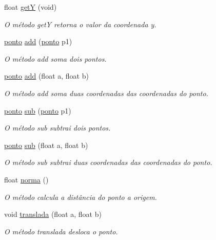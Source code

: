 \begin{DoxyCompactItemize}
float \hyperlink{classponto_a39aa79bee16cdf153e6434882ad342bc}{getY} (void)
\begin{DoxyCompactList}\small\item\em O método getY retorna o valor da coordenada y. \end{DoxyCompactList}\item 
\hyperlink{classponto}{ponto} \hyperlink{classponto_abbb3e8c2c0c74fba6c52e1b2c5ebfb76}{add} (\hyperlink{classponto}{ponto} p1)
\begin{DoxyCompactList}\small\item\em O método add soma dois pontos. \end{DoxyCompactList}\item 
\hyperlink{classponto}{ponto} \hyperlink{classponto_ae06f9e2b1b0bf804e58f871612c2ea54}{add} (float a, float b)
\begin{DoxyCompactList}\small\item\em O método add soma duas coordenadas das coordenadas do ponto. \end{DoxyCompactList}\item 
\hyperlink{classponto}{ponto} \hyperlink{classponto_ac2e219ffd3a478a4326792452c0af734}{sub} (\hyperlink{classponto}{ponto} p1)
\begin{DoxyCompactList}\small\item\em O método sub subtrai dois pontos. \end{DoxyCompactList}\item 
\hyperlink{classponto}{ponto} \hyperlink{classponto_ac2d3a9504aa439d716d20a2d87205959}{sub} (float a, float b)
\begin{DoxyCompactList}\small\item\em O método sub subtrai duas coordenadas das coordenadas do ponto. \end{DoxyCompactList}\item 
float \hyperlink{classponto_ab0c5fb0ddcd79fdb70fefe4cb6d7360e}{norma} ()
\begin{DoxyCompactList}\small\item\em O método calcula a distância do ponto a origem. \end{DoxyCompactList}\item 
void \hyperlink{classponto_a57873357b3df1ba47a54119d9a044a8e}{translada} (float a, float b)
\begin{DoxyCompactList}\small\item\em O método translada desloca o ponto. \end{DoxyCompactList}\item 

\end{DoxyCompactItemize}
